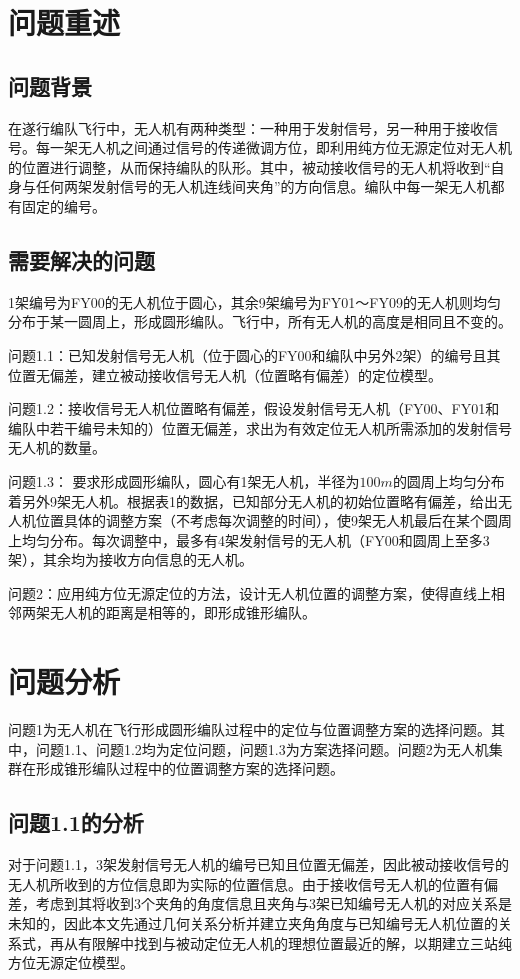\documentclass[12pt]{ctexart}
\begin{document}
\begin{spacing}{1.5}
\newpage %
\section{问题重述}
\subsection{问题背景}
在遂行编队飞行中，无人机有两种类型：一种用于发射信号，另一种用于接收信号。每一架无人机之间通过信号的传递微调方位，即利用纯方位无源定位对无人机的位置进行调整，从而保持编队的队形。其中，被动接收信号的无人机将收到“自身与任何两架发射信号的无人机连线间夹角”的方向信息。编队中每一架无人机都有固定的编号。
\subsection{需要解决的问题}
1架编号为FY00的无人机位于圆心，其余9架编号为FY01～FY09的无人机则均匀分布于某一圆周上，形成圆形编队。飞行中，所有无人机的高度是相同且不变的。

{\heiti 问题1.1：}已知发射信号无人机（位于圆心的FY00和编队中另外2架）的编号且其位置无偏差，建立被动接收信号无人机（位置略有偏差）的定位模型。

{\heiti 问题1.2：}接收信号无人机位置略有偏差，假设发射信号无人机（FY00、FY01和编队中若干编号未知的）位置无偏差，求出为有效定位无人机所需添加的发射信号无人机的数量。

{\heiti  问题1.3：} 要求形成圆形编队，圆心有1架无人机，半径为$100m$的圆周上均匀分布着另外9架无人机。根据表1的数据，已知部分无人机的初始位置略有偏差，给出无人机位置具体的调整方案（不考虑每次调整的时间），使9架无人机最后在某个圆周上均匀分布。每次调整中，最多有4架发射信号的无人机（FY00和圆周上至多3架），其余均为接收方向信息的无人机。

{\heiti 问题2：}应用纯方位无源定位的方法，设计无人机位置的调整方案，使得直线上相邻两架无人机的距离是相等的，即形成锥形编队。

\section{问题分析}
问题1为无人机在飞行形成圆形编队过程中的定位与位置调整方案的选择问题。其中，问题1.1、问题1.2均为定位问题，问题1.3为方案选择问题。问题2为无人机集群在形成锥形编队过程中的位置调整方案的选择问题。
\subsection{问题1.1的分析}
对于问题1.1，3架发射信号无人机的编号已知且位置无偏差，因此被动接收信号的无人机所收到的方位信息即为实际的位置信息。由于接收信号无人机的位置有偏差，考虑到其将收到3个夹角的角度信息且夹角与3架已知编号无人机的对应关系是未知的，因此本文先通过几何关系分析并建立夹角角度与已知编号无人机位置的关系式，再从有限解中找到与被动定位无人机的理想位置最近的解，以期建立三站纯方位无源定位模型。

\end{spacing}
\end{document}
